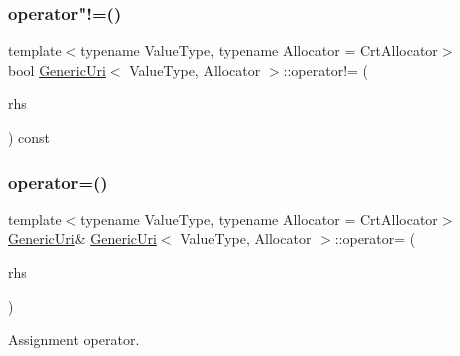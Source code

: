 \mbox{\label{classGenericUri_af220805902de60eda9f4286c017c9c95}} 
\subsubsection{\texorpdfstring{operator"!=()}{operator!=()}}
{\footnotesize\ttfamily template$<$typename Value\+Type, typename Allocator = Crt\+Allocator$>$ \\
bool \hyperlink{classGenericUri}{Generic\+Uri}$<$ Value\+Type, Allocator $>$\+::operator!= (\begin{DoxyParamCaption}\item[{const \hyperlink{classGenericUri}{Generic\+Uri}$<$ Value\+Type, Allocator $>$ \&}]{rhs }\end{DoxyParamCaption}) const\hspace{0.3cm}{\ttfamily [inline]}}

\mbox{\label{classGenericUri_a0d6608816d2eb6a7846bec4ddcc293d0}} 
\subsubsection{\texorpdfstring{operator=()}{operator=()}}
{\footnotesize\ttfamily template$<$typename Value\+Type, typename Allocator = Crt\+Allocator$>$ \\
\hyperlink{classGenericUri}{Generic\+Uri}\& \hyperlink{classGenericUri}{Generic\+Uri}$<$ Value\+Type, Allocator $>$\+::operator= (\begin{DoxyParamCaption}\item[{const \hyperlink{classGenericUri}{Generic\+Uri}$<$ Value\+Type, Allocator $>$ \&}]{rhs }\end{DoxyParamCaption})\hspace{0.3cm}{\ttfamily [inline]}}



Assignment operator. 

\mbox{\label{classGenericUri_aa2a0b3b540a2736ba253feddf848ff46}} 
